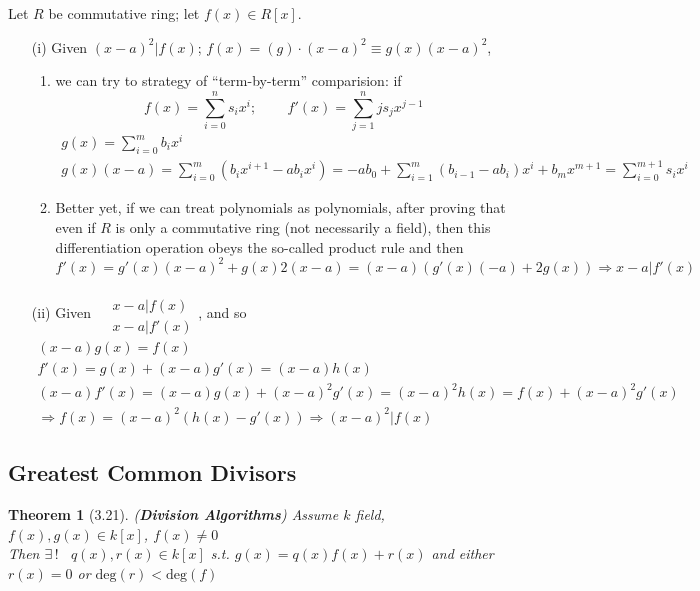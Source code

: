 \documentclass[twoside,landscape]{amsart}
\theoremstyle{plain}
\newtheorem{theorem}{Theorem}
\theoremstyle{definition}
\theoremstyle{remark}
\newcommand{\exercisehead}[1]
  { \smallskip
   \noindent{\small\bf Exercise #1.}
  }
\begin{document}
\begin{multicols*}{2}
\exercisehead{3.24} Let $R$ be commutative ring; let $f(x) \in R[x]$.

\begin{enumerate}
\item[(i)] Given $(x-a)^2 | f(x)$; $f(x) = (g)\cdot (x-a)^2 \equiv g(x) (x-a)^2$,
  \begin{enumerate}
  \item  we can try to strategy of ``term-by-term'' comparision: if
    \[
f(x) = \sum_{i=0}^n s_ix^i ; \qquad \, f'(x) = \sum_{j=1}^n js_j x^{j-1} 
\]
\[
\begin{gathered}
  g(x) = \sum_{i=0}^m b_ix^i \\
  g(x)(x-a) = \sum_{i=0}^m (b_i x^{i+1} - ab_i x^i ) = -ab_0 + \sum_{i=1}^m (b_{i-1} - ab_i) x^i + b_m x^{m+1} = \sum_{i=0}^{m+1} s_i x^i
\end{gathered}
\]
\item Better yet, if we can treat polynomials as polynomials, after proving that even if $R$ is only a commutative ring (not necessarily a field), then this differentiation operation obeys the so-called product rule and then
  \[
f'(x) = g'(x) (x-a)^2 + g(x) 2(x-a) = (x-a) (g'(x)(-a) + 2g(x)) \Longrightarrow \boxed{ x-a | f'(x) }
  \]
\end{enumerate}
\item[(ii)] Given $\begin{aligned} & \quad \\
  & x - a | f(x) \\
  & x-a | f'(x) \end{aligned}$, and so
  \[
\begin{gathered}
  (x-a)g(x) = f(x) \\ 
  f'(x) = g(x) + (x-a) g'(x) = (x-a)h(x) \\
  (x-a)f'(x) = (x-a)g(x) + (x-a)^2 g'(x) = (x-a)^2 h(x) = f(x) + (x-a)^2 g'(x) \\
  \Longrightarrow f(x) = (x-a)^2 (h(x) -g'(x)) \Longrightarrow \boxed{ (x-a)^2 | f(x) }
\end{gathered}
  \]
  \end{enumerate}

\subsection{ Greatest Common Divisors }

\begin{theorem}[3.21] (\textbf{Division Algorithms})
  Assume $k$ field, $f(x),g(x) \in k[x]$, $f(x)\neq 0$ \\
Then $\exists \, !$ \, $q(x),r(x) \in k[x]$ s.t. $g(x) = q(x)f(x) + r(x)$ and either $r(x)=0$ or $\text{deg}(r) < \text{deg}(f)$
\end{theorem}


\end{multicols*}
\end{document}
